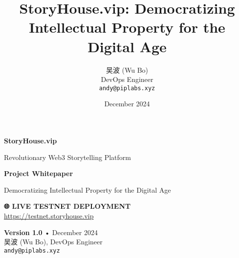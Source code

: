 \documentclass[12pt,a4paper]{article}
\title{StoryHouse.vip: Democratizing Intellectual Property for the Digital Age}
\author{吴波 (Wu Bo) \\ DevOps Engineer \\ \texttt{andy@piplabs.xyz}}
\date{December 2024}
\begin{document}
\begin{titlepage}
    \centering
    \vspace*{2cm}
    
    \textcolor{storyblue}{\Huge \textbf{StoryHouse.vip}}
    
    \vspace{1cm}
    \textcolor{storygray}{\Large Revolutionary Web3 Storytelling Platform}
    
    \vspace{2cm}
    {\huge \textbf{Project Whitepaper}}
    
    \vspace{0.5cm}
    {\Large \textcolor{storygray}{Democratizing Intellectual Property for the Digital Age}}
    
    \vspace{2cm}
    
    \begin{center}
    \end{center}
    
    \vspace{2cm}
    
    \begin{center}
    \textcolor{storygreen}{\textbf{🌐 LIVE TESTNET DEPLOYMENT}}\\
    \textcolor{storygray}{\url{https://testnet.storyhouse.vip}}
    \end{center}
    
    \vfill
    
    \begin{center}
    \textcolor{storygray}{
        \textbf{Version 1.0} • December 2024 \\
        吴波 (Wu Bo), DevOps Engineer \\
        \texttt{andy@piplabs.xyz}
    }
    \end{center}
    
    \vspace{1cm}
\end{titlepage}
\end{document}
